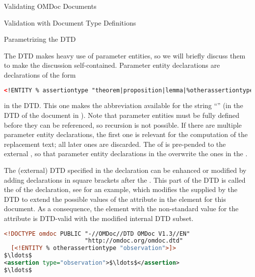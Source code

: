 \begin{tchapter}[id=validating]{Validating OMDoc Documents}
\begin{tsection}[id=validate-dtd]{Validation with Document Type Definitions}
\begin{tsubsection}[id=parameter-entities]{Parametrizing the DTD}

  The {\omdoc} DTD makes heavy use of parameter entities,
  so we will briefly discuss them to make the discussion self-contained. Parameter
  entity declarations are declarations of the form
\begin{center}
\begin{lstlisting}[language=XML,index={ENTITY}]
<!ENTITY % assertiontype "theorem|proposition|lemma|%otherassertiontype;">
\end{lstlisting}
\end{center}
in the DTD. This one makes the abbreviation {} available for the
string ``'' (in the DTD of the document in
{}). Note that parameter entities must be fully defined before they can
be referenced, so recursion is not possible. If there
are multiple parameter entity declarations, the first one is relevant for the computation
of the replacement text; all later ones are discarded. The {} of
{} is pre-pended to the external {}, so
that parameter entity declarations in the {} overwrite the ones
in the {}.

The (external) DTD specified in the {} declaration can be enhanced or
modified by adding declarations in square brackets after the {}
{}. This part of the DTD is called the
{} of the {}
declaration, see {} for an example, which modifies the
{} {} supplied by the {\omdoc}
DTD to extend the possible values of the {} attribute in the
{} element for this document. As a consequence, the
{} element with the non-standard value for the
{} attribute is DTD-valid with the modified internal DTD
subset.

\begin{lstlisting}[label=lst:internal,language=XML,morekeywords={omdoc},mathescape,
  caption={A Document Type Declaration with Internal Subset},
  index={DOCTYPE,ENTITY,ELEMENT,ATTLIST,omdoc,PUBLIC}]
<!DOCTYPE omdoc PUBLIC "-//OMDoc//DTD OMDoc V1.3//EN"
                       "http://omdoc.org/omdoc.dtd" 
  [<!ENTITY % otherassertiontype "observation">]>
$\ldots$
<assertion type="observation">$\ldots$</assertion>
$\ldots$
\end{lstlisting}
\end{tsubsection}


\end{tsection}
\end{tchapter}
